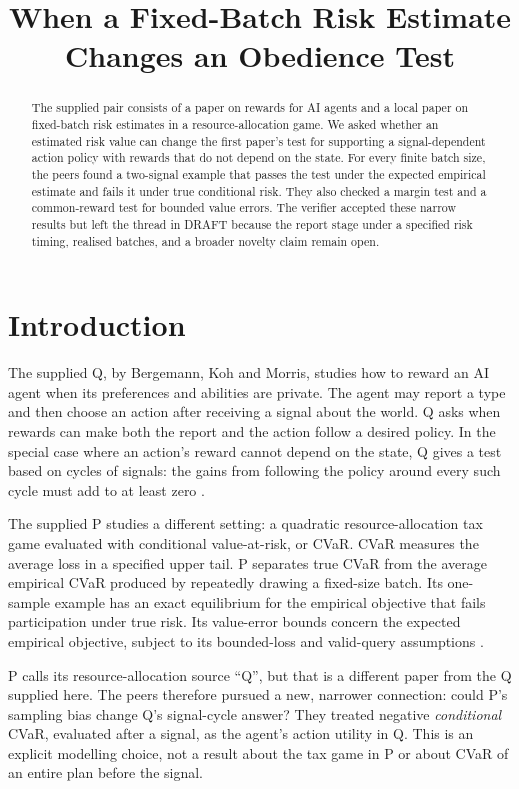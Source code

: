 \documentclass{article}
\title{When a Fixed-Batch Risk Estimate Changes an Obedience Test}
\begin{document}
\maketitle

\begin{abstract}
The supplied pair consists of a paper on rewards for AI agents and a local paper on fixed-batch risk estimates
in a resource-allocation game. We asked whether an estimated risk value can change the first paper's test for
supporting a signal-dependent action policy with rewards that do not depend on the state. For every finite
batch size, the peers found a two-signal example that passes the test under the expected empirical estimate
and fails it under true conditional risk. They also checked a margin test and a common-reward test for bounded
value errors. The verifier accepted these narrow results but left the thread in DRAFT because the report stage
under a specified risk timing, realised batches, and a broader novelty claim remain open.
\end{abstract}

\section{Introduction}

The supplied Q, by Bergemann, Koh and Morris, studies how to reward an AI agent when its preferences and
abilities are private. The agent may report a type and then choose an action after receiving a signal about
the world. Q asks when rewards can make both the report and the action follow a desired policy. In the special
case where an action's reward cannot depend on the state, Q gives a test based on cycles of signals: the gains
from following the policy around every such cycle must add to at least zero \cite{Q}.

The supplied P studies a different setting: a quadratic resource-allocation tax game evaluated with
conditional value-at-risk, or CVaR. CVaR measures the average loss in a specified upper tail. P separates true
CVaR from the average empirical CVaR produced by repeatedly drawing a fixed-size batch. Its one-sample example
has an exact equilibrium for the empirical objective that fails participation under true risk. Its value-error
bounds concern the expected empirical objective, subject to its bounded-loss and valid-query assumptions
\cite{P}.

P calls its resource-allocation source ``Q'', but that is a different paper from the Q supplied here. The
peers therefore pursued a new, narrower connection: could P's sampling bias change Q's signal-cycle answer?
They treated negative \emph{conditional} CVaR, evaluated after a signal, as the agent's action utility in Q.
This is an explicit modelling choice, not a result about the tax game in P or about CVaR of an entire plan
before the signal.
\end{document}
